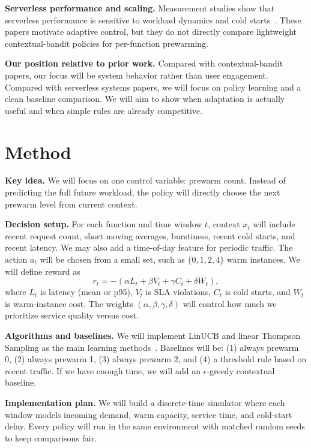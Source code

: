 \documentclass{article}
\begin{document}
\textbf{Serverless performance and scaling.}
Measurement studies show that serverless performance is sensitive to workload dynamics and cold starts~\cite{wang2018peeking,lloyd2018serverless,shahrad2020serverless}. These papers motivate adaptive control, but they do not directly compare lightweight contextual-bandit policies for per-function prewarming.

\textbf{Our position relative to prior work.}
Compared with contextual-bandit papers, our focus will be system behavior rather than user engagement. Compared with serverless systems papers, we will focus on policy learning and a clean baseline comparison. We will aim to show when adaptation is actually useful and when simple rules are already competitive.

\section{Method}
\textbf{Key idea.}
We will focus on one control variable: prewarm count. Instead of predicting the full future workload, the policy will directly choose the next prewarm level from current context.

\textbf{Decision setup.}
For each function and time window $t$, context $x_t$ will include recent request count, short moving averages, burstiness, recent cold starts, and recent latency. We may also add a time-of-day feature for periodic traffic. The action $a_t$ will be chosen from a small set, such as $\{0,1,2,4\}$ warm instances. We will define reward as
\[
r_t = -\left(\alpha L_t + \beta V_t + \gamma C_t + \delta W_t\right),
\]
where $L_t$ is latency (mean or p95), $V_t$ is SLA violations, $C_t$ is cold starts, and $W_t$ is warm-instance cost. The weights $(\alpha,\beta,\gamma,\delta)$ will control how much we prioritize service quality versus cost.

\textbf{Algorithms and baselines.}
We will implement LinUCB and linear Thompson Sampling as the main learning methods~\cite{li2010contextual,agrawal2013thompson}. Baselines will be: (1) always prewarm 0, (2) always prewarm 1, (3) always prewarm 2, and (4) a threshold rule based on recent traffic. If we have enough time, we will add an $\epsilon$-greedy contextual baseline.

\textbf{Implementation plan.}
We will build a discrete-time simulator where each window models incoming demand, warm capacity, service time, and cold-start delay. Every policy will run in the same environment with matched random seeds to keep comparisons fair.
\newpage
\end{document}
